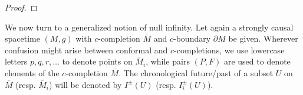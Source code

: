 \begin{proof}
\end{proof}

We now turn to a generalized notion of null infinity. 
Let again a strongly causal spacetime $(M,g)$ with $c$-completion $\overline{M}$ and $c$-boundary $\partial M$ be given. Wherever confusion might arise between conformal and $c$-completions, we use lowercase letters $p,q,r, \ldots$ to denote points on $\overline{M}_i$, while pairs $(P,F)$ are used to denote elements of the $c$-completion $\overline{M}$. The chronological future/past of a subset $U$ on $\overline{M}$ (resp. $\overline{M}_i$) will be denoted by $I^{\pm}(U)$ (resp. $I_i^{\pm}(U)$).


